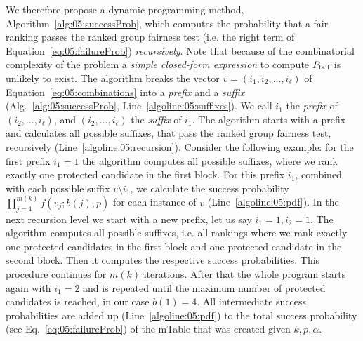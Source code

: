 
We therefore propose a dynamic programming method, Algorithm~\ref{alg:05:successProb}, which computes the probability that a fair ranking passes the ranked group fairness test (i.e. the right term of Equation~\ref{eq:05:failureProb}) \emph{recursively}.
%
Note that because of the combinatorial complexity of the problem a \emph{simple closed-form expression} to compute $P_{\operatorname{fail}}$ is unlikely to exist.
%
%
%
The algorithm breaks the vector $v = (i_1, i_2, \ldots ,i_{\ell})$ of Equation~\ref{eq:05:combinations} into a \textit{prefix} and a \textit{suffix} (Alg.~\ref{alg:05:successProb}, Line~\ref{algoline:05:suffixes}).
%
We call $i_1$ the \textit{prefix} of $(i_2, \ldots, i_{\ell})$, and $(i_2, \ldots, i_{\ell})$ the \textit{suffix} of $i_1$.
%
The algorithm starts with a prefix and calculates all possible suffixes, that pass the ranked group fairness test, recursively (Line~\ref{algoline:05:recursion}).
%
Consider the following example: for the first prefix $i_1 = 1$ the algorithm computes all possible suffixes, where we rank exactly one protected candidate in the first block.
%
For this prefix $i_1$, combined with each possible suffix $v \setminus i_1$, we calculate the success probability $\prod_{j=1}^{m(k)} f(v_j; b(j), p)$ for each instance of $v$ (Line~\ref{algoline:05:pdf}).
%
In the next recursion level we start with a new prefix, let us say $i_1=1, i_2 =1$.
%
The algorithm computes all possible suffixes, i.e. all rankings where we rank exactly one protected candidates in the first block and one protected candidate in the second block.
%
Then it computes the respective success probabilities.
%
This procedure continues for $m(k)$ iterations.
%
After that the whole program starts again with $i_1=2$ and is repeated until the maximum number of protected candidates is reached, in our case $b(1)=4$.
%
All intermediate success probabilities are added up (Line~\ref{algoline:05:pdf}) to the total success probability (see Eq.~\ref{eq:05:failureProb}) of the mTable that was created given $k, p, \alpha$.

